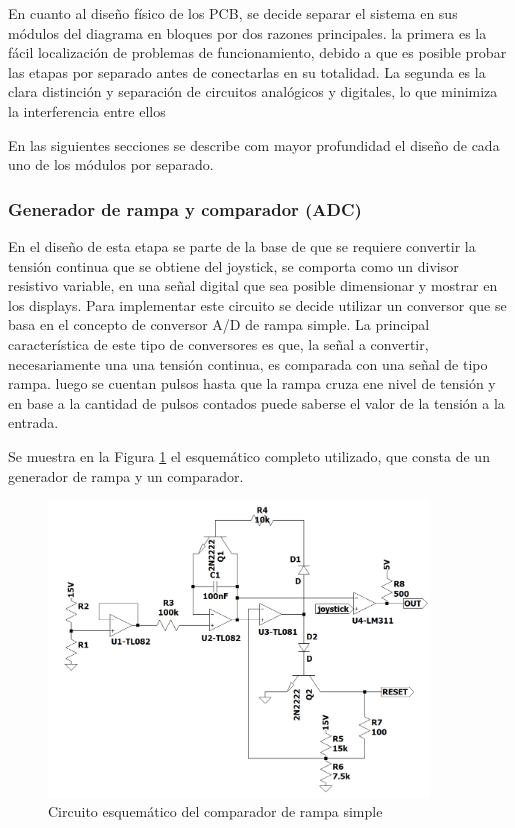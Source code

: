 En cuanto al dise\~no f\'isico de los PCB, se decide separar el sistema en sus m\'odulos del diagrama en bloques por dos razones principales. la primera es la f\'acil localizaci\'on de problemas de funcionamiento, debido a que es posible probar las etapas por separado antes de conectarlas en su totalidad. La segunda es la clara distinci\'on y separaci\'on de circuitos anal\'ogicos y digitales, lo que minimiza la interferencia entre ellos 

En las siguientes secciones se describe com mayor profundidad el dise\~no de cada uno de los m\'odulos por separado.


\subsubsection{Generador de rampa y comparador (ADC)}
En el dise\~no de esta etapa se parte de la base de que se requiere convertir la tensi\'on continua que se obtiene del joystick, se comporta como un divisor resistivo variable, en una se\~nal digital que sea posible dimensionar y mostrar en los displays.
Para implementar este circuito se decide utilizar un conversor que se basa en el concepto de conversor A/D de rampa simple. La principal caracter\'istica de este tipo de conversores es que, la se\~nal a convertir, necesariamente una una tensi\'on continua, es comparada con una se\~nal de tipo rampa.
luego se cuentan pulsos hasta que la rampa cruza ene nivel de tensi\'on y en base a la cantidad de pulsos contados puede saberse el valor de la tensi\'on a la entrada.

Se muestra en la Figura \ref{fig:CIRCUIT_RAMP}  el esquem\'atico completo utilizado, que consta de un generador de rampa y un comparador. 
\begin{figure}[H]
    \centering
    \includegraphics[width=0.9\textwidth]{../EJ8/Recursos/analogCircuit.png}
    \caption{Circuito esquem\'atico del comparador de rampa simple}
    \label{fig:CIRCUIT_RAMP} 
\end{figure}


